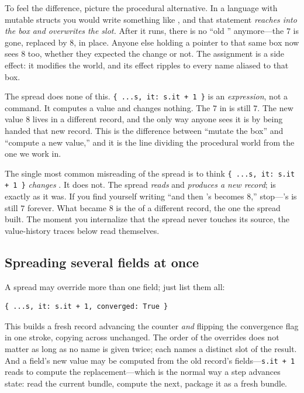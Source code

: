 To feel the difference, picture the procedural alternative. In a language with
mutable structs you would write something like , and that
statement \emph{reaches into the box  and overwrites the  slot.}
After it runs, there is no ``old '' anymore---the $7$ is gone, replaced
by $8$, in place. Anyone else holding a pointer to that same box now sees $8$
too, whether they expected the change or not. The assignment is a side effect: it
modifies the world, and its effect ripples to every name aliased to that box.

The spread does none of this. \lstinline[style=l4style]|{ ...s, it: s.it + 1 }|
is an \emph{expression}, not a command. It computes a value and changes nothing.
The $7$ in  is still $7$. The new value $8$ lives in a different
record, and the only way anyone sees it is by being handed that new record. This
is the difference between ``mutate the box'' and ``compute a new value,'' and it
is the line dividing the procedural world from the one we work in.

\begin{pitfall}
The single most common misreading of the spread is to think
\lstinline[style=l4style]|{ ...s, it: s.it + 1 }| \emph{changes }. It
does not. The spread \emph{reads}  and \emph{produces a new record};
 is exactly as it was. If you find yourself writing ``and then 's
 becomes $8$,'' stop---'s  is still $7$ forever. What
became $8$ is the  of a different record, the one the spread built. The
moment you internalize that the spread never touches its source, the value-history
traces below read themselves.
\end{pitfall}

\subsection{Spreading several fields at once}

A spread may override more than one field; just list them all:

\begin{lstlisting}[style=l4style]
{ ...s, it: s.it + 1, converged: True }
\end{lstlisting}

This builds a fresh record advancing the counter \emph{and} flipping the
convergence flag in one stroke, copying  across unchanged. The order of
the overrides does not matter as long as no name is given twice; each names a
distinct slot of the result. And a field's new value may be computed from the old
record's fields---\lstinline[style=l4style]|s.it + 1| reads  to
compute the replacement---which is the normal way a step advances state: read the
current bundle, compute the next, package it as a fresh bundle.

